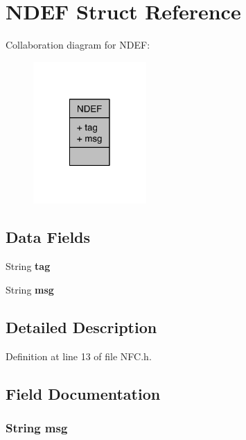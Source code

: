 \hypertarget{structNDEF}{\section{N\-D\-E\-F Struct Reference}
\label{structNDEF}
}


Collaboration diagram for N\-D\-E\-F\-:\nopagebreak
\begin{figure}[H]
\begin{center}
\leavevmode
\includegraphics[width=122pt]{d2/d2b/structNDEF__coll__graph}
\end{center}
\end{figure}
\subsection*{Data Fields}
\begin{DoxyCompactItemize}
\item 
\hypertarget{structNDEF_a3d1b2b9aa7be6b4548fc2e6dbd97103f}{String {\bfseries tag}}\label{structNDEF_a3d1b2b9aa7be6b4548fc2e6dbd97103f}

\item 
\hypertarget{structNDEF_a05873af37984ef32c8ba2a6308956bb3}{String {\bfseries msg}}\label{structNDEF_a05873af37984ef32c8ba2a6308956bb3}

\end{DoxyCompactItemize}


\subsection{Detailed Description}


Definition at line 13 of file N\-F\-C.\-h.



\subsection{Field Documentation}
\hypertarget{structNDEF_a05873af37984ef32c8ba2a6308956bb3}{
\subsubsection[{msg}]{\setlength{\rightskip}{0pt plus 5cm}String msg}}\label{structNDEF_a05873af37984ef32c8ba2a6308956bb3}


